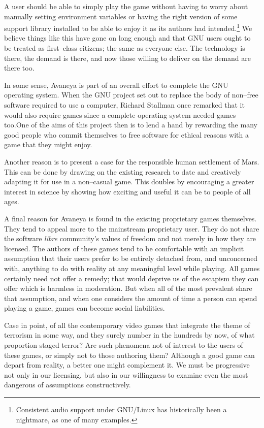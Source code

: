 A user should be able to simply play the game without having to worry about manually setting environment variables or having the right version of some support library installed to be able to enjoy it as its authors had intended.\footnote{Consistent audio support under GNU/Linux has historically been a nightmare, as one of many examples.} We believe things like this have gone on long enough and that GNU users ought to be treated as first--class citizens; the same as everyone else. The technology is there, the demand is there, and now those willing to deliver on the demand are there too.

In some sense, Avaneya is part of an overall effort to complete the GNU operating system. When the GNU project set out to replace the body of non--free software required to use a computer, Richard Stallman once remarked that it would also require games since a complete operating system needed games too. One of the aims of this project then is to lend a hand by rewarding the many good people who commit themselves to free software for ethical reasons with a game that they might enjoy.

Another reason is to present a case for the responsible human settlement of Mars. This can be done by drawing on the existing research to date and creatively adapting it for use in a non--casual game. This doubles by encouraging a greater interest in science by showing how exciting and useful it can be to people of all ages.

A final reason for Avaneya is found in the existing proprietary games themselves. They tend to appeal more to the mainstream proprietary user. They do not share the software {\it libre} community's values of freedom and not merely in how they are licensed. The authors of these games tend to be comfortable with an implicit assumption that their users prefer to be entirely detached from, and unconcerned with, anything to do with reality at any meaningful level while playing. All games certainly need not offer a remedy; that would deprive us of the escapism they can offer which is harmless in moderation. But when all of the most prevalent share that assumption, and when one considers the amount of time a person can spend playing a game, games can become social liabilities.

Case in point, of all the contemporary video games that integrate the theme of terrorism in some way, and they surely number in the hundreds by now, of what proportion staged terror? Are such phenomena not of interest to the users of these games, or simply not to those authoring them? Although a good game can depart from reality, a better one might complement it. We must be progressive not only in our licensing, but also in our willingness to examine even the most dangerous of assumptions constructively. 

